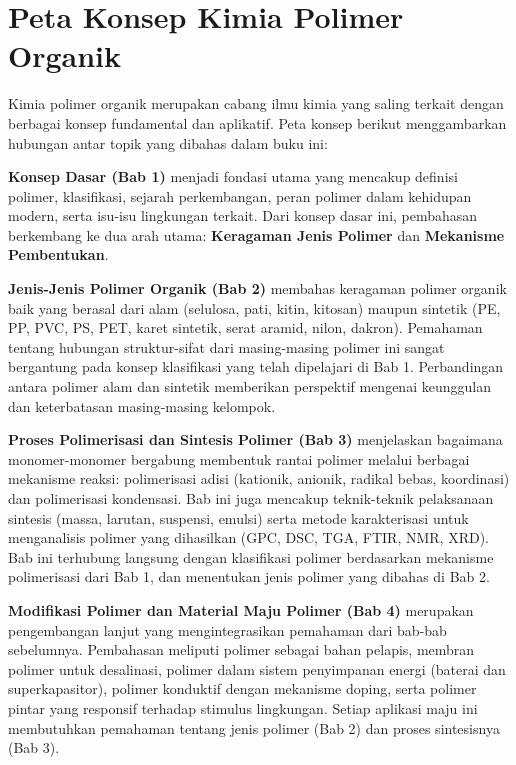 \documentclass[12pt,a4paper,openany]{book}
\begin{document}
\newpage

\chapter*{Peta Konsep Kimia Polimer Organik}

Kimia polimer organik merupakan cabang ilmu kimia yang saling terkait dengan berbagai konsep fundamental dan aplikatif. Peta konsep berikut menggambarkan hubungan antar topik yang dibahas dalam buku ini:

\textbf{Konsep Dasar (Bab 1)} menjadi fondasi utama yang mencakup definisi polimer, klasifikasi, sejarah perkembangan, peran polimer dalam kehidupan modern, serta isu-isu lingkungan terkait. Dari konsep dasar ini, pembahasan berkembang ke dua arah utama: \textbf{Keragaman Jenis Polimer} dan \textbf{Mekanisme Pembentukan}.

\textbf{Jenis-Jenis Polimer Organik (Bab 2)} membahas keragaman polimer organik baik yang berasal dari alam (selulosa, pati, kitin, kitosan) maupun sintetik (PE, PP, PVC, PS, PET, karet sintetik, serat aramid, nilon, dakron). Pemahaman tentang hubungan struktur-sifat dari masing-masing polimer ini sangat bergantung pada konsep klasifikasi yang telah dipelajari di Bab 1. Perbandingan antara polimer alam dan sintetik memberikan perspektif mengenai keunggulan dan keterbatasan masing-masing kelompok.

\textbf{Proses Polimerisasi dan Sintesis Polimer (Bab 3)} menjelaskan bagaimana monomer-monomer bergabung membentuk rantai polimer melalui berbagai mekanisme reaksi: polimerisasi adisi (kationik, anionik, radikal bebas, koordinasi) dan polimerisasi kondensasi. Bab ini juga mencakup teknik-teknik pelaksanaan sintesis (massa, larutan, suspensi, emulsi) serta metode karakterisasi untuk menganalisis polimer yang dihasilkan (GPC, DSC, TGA, FTIR, NMR, XRD). Bab ini terhubung langsung dengan klasifikasi polimer berdasarkan mekanisme polimerisasi dari Bab 1, dan menentukan jenis polimer yang dibahas di Bab 2.

\textbf{Modifikasi Polimer dan Material Maju Polimer (Bab 4)} merupakan pengembangan lanjut yang mengintegrasikan pemahaman dari bab-bab sebelumnya. Pembahasan meliputi polimer sebagai bahan pelapis, membran polimer untuk desalinasi, polimer dalam sistem penyimpanan energi (baterai dan superkapasitor), polimer konduktif dengan mekanisme doping, serta polimer pintar yang responsif terhadap stimulus lingkungan. Setiap aplikasi maju ini membutuhkan pemahaman tentang jenis polimer (Bab 2) dan proses sintesisnya (Bab 3).
\end{document}
